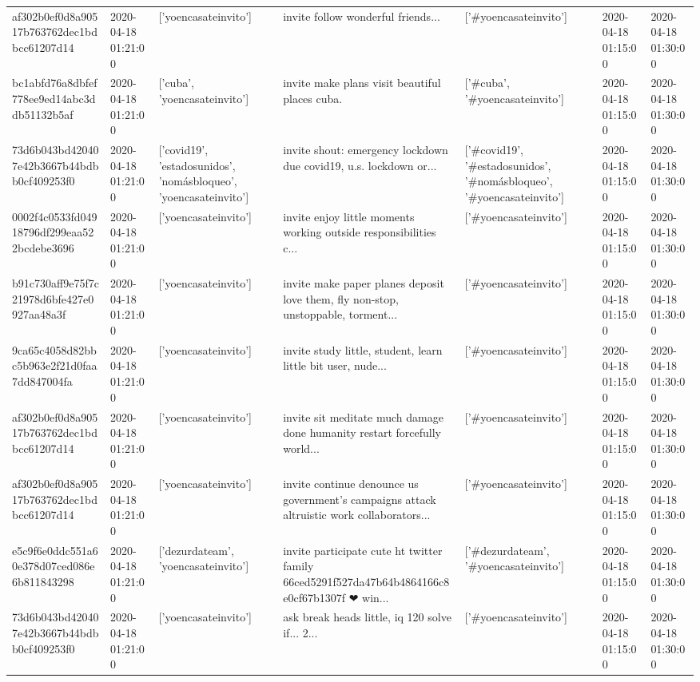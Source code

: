 \begin{tabular}{lllllll}
af302b0ef0d8a90517b763762dec1bdbcc61207d14 & 2020-04-18 01:21:00 & ['yoencasateinvito'] & invite follow wonderful friends... & ['#yoencasateinvito'] & 2020-04-18 01:15:00 & 2020-04-18 01:30:00 \\
bc1abfd76a8dbfef778ee9ed14abc3ddb51132b5af & 2020-04-18 01:21:00 & ['cuba', 'yoencasateinvito'] & invite make plans visit beautiful places cuba. & ['#cuba', '#yoencasateinvito'] & 2020-04-18 01:15:00 & 2020-04-18 01:30:00 \\
73d6b043bd420407e42b3667b44bdbb0cf409253f0 & 2020-04-18 01:21:00 & ['covid19', 'estadosunidos', 'nomásbloqueo', 'yoencasateinvito'] & invite shout: emergency lockdown due covid19, u.s. lockdown or... & ['#covid19', '#estadosunidos', '#nomásbloqueo', '#yoencasateinvito'] & 2020-04-18 01:15:00 & 2020-04-18 01:30:00 \\
0002f4c0533fd04918796df299eaa522bcdebe3696 & 2020-04-18 01:21:00 & ['yoencasateinvito'] & invite enjoy little moments working outside responsibilities c... & ['#yoencasateinvito'] & 2020-04-18 01:15:00 & 2020-04-18 01:30:00 \\
b91c730aff9e75f7c21978d6bfe427e0927aa48a3f & 2020-04-18 01:21:00 & ['yoencasateinvito'] & invite make paper planes deposit love them, fly non-stop, unstoppable, torment... & ['#yoencasateinvito'] & 2020-04-18 01:15:00 & 2020-04-18 01:30:00 \\
9ca65c4058d82bbc5b963e2f21d0faa7dd847004fa & 2020-04-18 01:21:00 & ['yoencasateinvito'] & invite study little, student, learn little bit user, nude... & ['#yoencasateinvito'] & 2020-04-18 01:15:00 & 2020-04-18 01:30:00 \\
af302b0ef0d8a90517b763762dec1bdbcc61207d14 & 2020-04-18 01:21:00 & ['yoencasateinvito'] & invite sit meditate much damage done humanity restart forcefully world... & ['#yoencasateinvito'] & 2020-04-18 01:15:00 & 2020-04-18 01:30:00 \\
af302b0ef0d8a90517b763762dec1bdbcc61207d14 & 2020-04-18 01:21:00 & ['yoencasateinvito'] & invite continue denounce us government's campaigns attack altruistic work collaborators... & ['#yoencasateinvito'] & 2020-04-18 01:15:00 & 2020-04-18 01:30:00 \\
e5c9f6e0ddc551a60e378d07ced086e6b811843298 & 2020-04-18 01:21:00 & ['dezurdateam', 'yoencasateinvito'] & invite participate cute ht twitter family 66ced5291f527da47b64b4864166c8e0cf67b1307f ❤ win... & ['#dezurdateam', '#yoencasateinvito'] & 2020-04-18 01:15:00 & 2020-04-18 01:30:00 \\
73d6b043bd420407e42b3667b44bdbb0cf409253f0 & 2020-04-18 01:21:00 & ['yoencasateinvito'] & ask break heads little, iq 120 solve if... 2... & ['#yoencasateinvito'] & 2020-04-18 01:15:00 & 2020-04-18 01:30:00 \\

\end{tabular}
